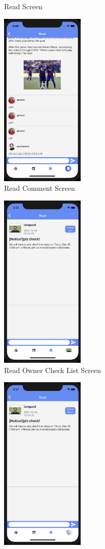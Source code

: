 \documentclass[conference]{IEEEtran}
\begin{document}
\begin{enumerate}
\begin{figure}[h]
        \caption{Read Screen}
        \label{fig:my_label}
    \end{figure}
    \begin{figure}[h]
        \centering
        \includegraphics[width=4cm]{images/read2.png}
        \caption{Read Comment Screen}
        \label{fig:my_label}
    \end{figure}
    \begin{figure}[h]
        \centering
        \includegraphics[width=4cm]{images/read3.png}
        \caption{Read Owner Check List Screen}
        \label{fig:my_label}
    \end{figure}
    \begin{figure}[h]
        \centering
        \includegraphics[width=4cm]{images/read4.png}

\end{figure}
\end{enumerate}
\end{document}
